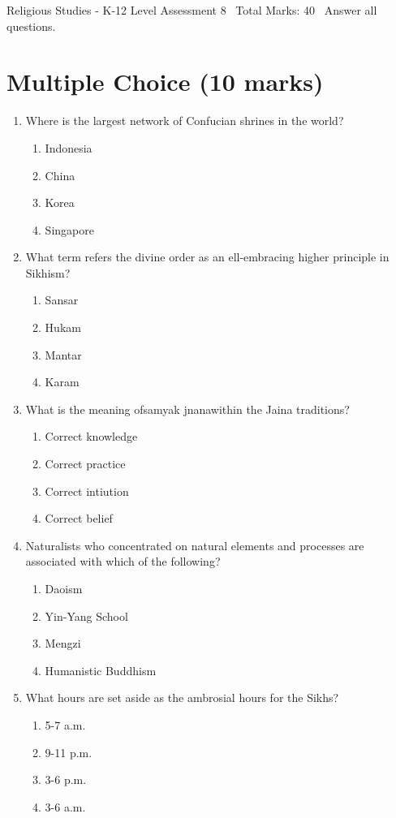 \documentclass[12pt]{article}
\begin{document}
\begin{center}
Religious Studies - K-12 Level Assessment 8 \
Total Marks: 40 \
Answer all questions.
\end{center}

\section*{Multiple Choice (10 marks)}
\begin{enumerate}[label=\arabic*.]
\item Where is the largest network of Confucian shrines in the world?
\begin{enumerate}[label=(\alph*)]
    \item Indonesia
    \item China
    \item Korea
    \item Singapore
\end{enumerate}
\item What term refers the divine order as an ell-embracing higher principle in Sikhism?
\begin{enumerate}[label=(\alph*)]
    \item Sansar
    \item Hukam
    \item Mantar
    \item Karam
\end{enumerate}
\item What is the meaning ofsamyak jnanawithin the Jaina traditions?
\begin{enumerate}[label=(\alph*)]
    \item Correct knowledge
    \item Correct practice
    \item Correct intiution
    \item Correct belief
\end{enumerate}
\item Naturalists who concentrated on natural elements and processes are associated with which of the following?
\begin{enumerate}[label=(\alph*)]
    \item Daoism
    \item Yin-Yang School
    \item Mengzi
    \item Humanistic Buddhism
\end{enumerate}
\item What hours are set aside as the ambrosial hours for the Sikhs?
\begin{enumerate}[label=(\alph*)]
    \item 5-7 a.m.
    \item 9-11 p.m.
    \item 3-6 p.m.
    \item 3-6 a.m.
\end{enumerate}
\end{enumerate}
\end{document}
